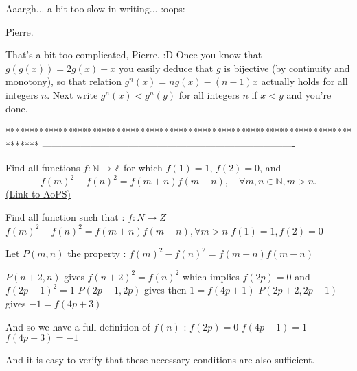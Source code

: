 \begin{solution}
	Aaargh... a bit too slow in writing... :oops: 

Pierre.
\end{solution}



\begin{solution}
	That's a bit too complicated, Pierre.  :D  Once you know that $ g(g(x))=2g(x)-x$ you easily deduce that $ g$ is bijective (by continuity and monotony), so that relation $ g^n(x)=ng(x)-(n-1)x$ actually holds for all integers $ n$. Next write $ g^n(x)<g^n(y)$ for all integers $ n$ if $ x<y$ and you're done.
\end{solution}
*******************************************************************************
-------------------------------------------------------------------------------

\begin{problem}
	Find all functions $f:\mathbb N\to\mathbb Z$ for which $f(1)=1$, $f(2)=0$, and 
\[f(m)^2-f(n)^2=f(m+n)f(m-n),\quad \forall m,n \in \mathbb N, m>n.\]
	\flushright \href{https://artofproblemsolving.com/community/c6h181737}{(Link to AoPS)}
\end{problem}



\begin{solution}
	\begin{tcolorbox}Find all function such that : 
$ f: N\to Z$ 
$ f(m)^2 - f(n)^2 = f(m + n)f(m - n),\forall m > n$
$ f(1) = 1 ,f(2) = 0$\end{tcolorbox}

Let $ P(m,n)$ the property : $ f(m)^2 - f(n)^2 = f(m + n)f(m - n)$

$ P(n+2,n)$ gives $ f(n+2)^2=f(n)^2$ which implies $ f(2p)=0$ and $ f(2p+1)^2=1$
$ P(2p+1,2p)$ gives then $ 1=f(4p+1)$
$ P(2p+2,2p+1)$ gives $ -1=f(4p+3)$

And so we have a full definition of $ f(n)$ :
$ f(2p)=0$
$ f(4p+1)=1$
$ f(4p+3)=-1$

And it is easy to verify that these necessary conditions are also sufficient.
\end{solution}



